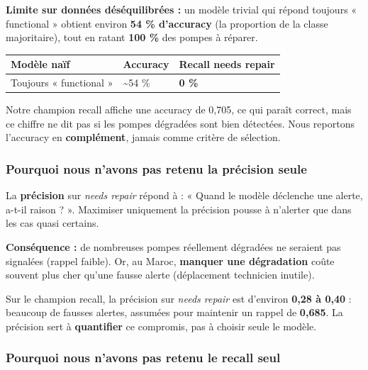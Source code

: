 \documentclass[11pt,a4paper]{report}
\begin{document}
\textbf{Limite sur données déséquilibrées :} un modèle trivial qui répond toujours « functional » obtient environ \textbf{54 \% d'accuracy} (la proportion de la classe majoritaire), tout en ratant \textbf{100 \%} des pompes à réparer.



\begin{longtable}{@{}lll@{}}
\toprule
Modèle naïf & Accuracy & Recall needs repair \\
\midrule
Toujours « functional » & \textasciitilde{}54 \% & \textbf{0 \%} \\
\bottomrule
\end{longtable}




Notre champion recall affiche une accuracy de 0,705, ce qui paraît correct, mais ce chiffre ne dit pas si les pompes dégradées sont bien détectées. Nous reportons l'accuracy en \textbf{complément}, jamais comme critère de sélection.



\subsubsection{Pourquoi nous n'avons pas retenu la précision seule}



La \textbf{précision} sur \textit{needs repair} répond à : « Quand le modèle déclenche une alerte, a-t-il raison ? ». Maximiser uniquement la précision pousse à n'alerter que dans les cas quasi certains.



\textbf{Conséquence :} de nombreuses pompes réellement dégradées ne seraient pas signalées (rappel faible). Or, au Maroc, \textbf{manquer une dégradation} coûte souvent plus cher qu'une fausse alerte (déplacement technicien inutile).



Sur le champion recall, la précision sur \textit{needs repair} est d'environ \textbf{0,28 à 0,40} : beaucoup de fausses alertes, assumées pour maintenir un rappel de \textbf{0,685}. La précision sert à \textbf{quantifier} ce compromis, pas à choisir seule le modèle.



\subsubsection{Pourquoi nous n'avons pas retenu le recall seul}
\end{document}
